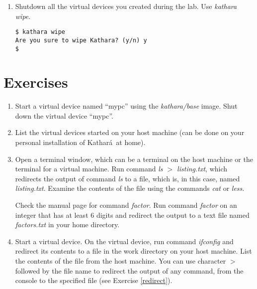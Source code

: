\documentclass[12pt]{book}
\newcommand{\kathara}{Kathar\'a}
\begin{document}
\begin{enumerate}[resume*]
\item Shutdown all the virtual devices you created during the lab. Use \emph{kathara wipe}.

\begin{lstlisting}
$ kathara wipe
Are you sure to wipe Kathara? (y/n) y
$ 
\end{lstlisting}
\end{enumerate}

\section{Exercises}

\begin{enumerate}
\item Start a virtual device named ``mypc'' using the \emph{kathara/base} image. Shut down the virtual device ``mypc''.
\item List the virtual devices started on your host machine (can be done on your personal installation of \kathara\ at home).
\item\label{redirect} Open a terminal window, which can be a terminal
  on the host machine or the terminal for a virtual machine. Run
  command \emph{ls $>$ listing.txt}, which redirects the output of command \emph{ls} to a file, which is, in this case, named \emph{listing.txt}. Examine the contents of the file using the commands \emph{cat} or \emph{less}. 

Check the manual page for command \emph{factor}. Run command \emph{factor} on an integer that has at least 6 digits and redirect the output to a text file named \emph{factors.txt} in your home directory. 

\item Start a virtual device. On the virtual device, run command \emph{ifconfig} and redirect its contents to a file in the work directory on your host machine. List the contents of the file from the host machine. You can use character $>$ followed by the file name to redirect the output of any command, from the console to the specified file (see Exercise \ref{redirect}).


\end{enumerate}
\end{document}
